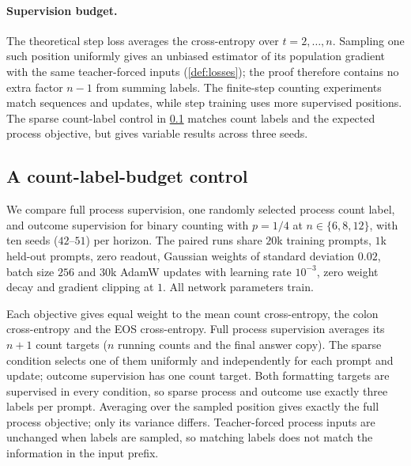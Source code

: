 \paragraph{Supervision budget.}
The theoretical step loss averages the cross-entropy over $t=2,\ldots,n$.
Sampling one such position uniformly gives an unbiased estimator of its population
gradient with the same teacher-forced inputs (\cref{def:losses}); the proof therefore
contains no extra factor $n-1$ from summing labels. The finite-step counting experiments
match sequences and updates, while step training uses more supervised positions.
The sparse count-label control in \cref{app:label-budget} matches count labels
and the expected process objective, but gives variable results across three seeds.


\subsection{A count-label-budget control}
\label{app:label-budget}
We compare full process supervision, one randomly selected process count label, and outcome supervision for
binary counting with $p=1/4$ at $n\in\{6,8,12\}$, with ten seeds ($42$--$51$) per horizon. The paired runs share $20$k
training prompts, $1$k held-out prompts, zero readout, Gaussian weights of standard deviation $0.02$, batch size $256$ and
$30$k AdamW updates with learning rate $10^{-3}$, zero weight decay and gradient clipping at $1$. All network parameters train.

Each objective gives equal weight to the mean count cross-entropy, the colon cross-entropy and the EOS cross-entropy.
Full process supervision averages its $n+1$ count targets ($n$ running counts and the final answer copy). The sparse
condition selects one of them uniformly and independently for each prompt and update; outcome supervision has one
count target. Both formatting targets are supervised in every condition, so sparse process and outcome use exactly
three labels per prompt. Averaging over the sampled position gives exactly the full process objective; only its
variance differs. Teacher-forced process inputs are unchanged when labels are sampled, so matching labels does not
match the information in the input prefix.

